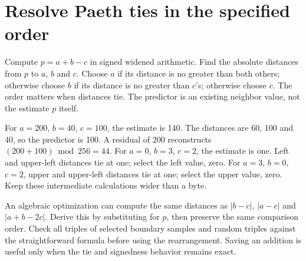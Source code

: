 \section{Resolve Paeth ties in the specified order}
Compute $p=a+b-c$ in signed widened arithmetic. Find the absolute distances from $p$
to $a$, $b$ and $c$. Choose $a$ if its distance is no greater than both others;
otherwise choose $b$ if its distance is no greater than $c$'s; otherwise choose $c$.
The order matters when distances tie. The predictor is an existing neighbor value,
not the estimate $p$ itself.

For $a=200$, $b=40$, $c=100$, the estimate is 140. The distances are 60, 100 and 40,
so the predictor is 100. A residual of 200 reconstructs $(200+100)\bmod256=44$.
For $a=0$, $b=3$, $c=2$, the estimate is one. Left and upper-left
distances tie at one; select the left value, zero. For $a=3$, $b=0$, $c=2$,
upper and upper-left distances tie at one; select the upper value, zero. Keep these intermediate calculations wider than a byte.

An algebraic optimization can compute the same distances as
$|b-c|$, $|a-c|$ and $|a+b-2c|$. Derive this by substituting for $p$, then preserve
the same comparison order. Check all triples of selected boundary samples and
random triples against the straightforward formula before using the rearrangement.
Saving an addition is useful only when the tie and signedness behavior remains exact.
